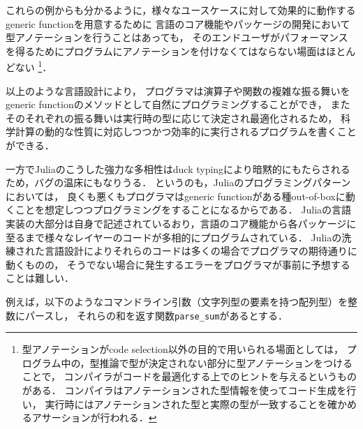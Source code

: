 これらの例からも分かるように，様々なユースケースに対して効果的に動作するgeneric functionを用意するために
言語のコア機能やパッケージの開発において型アノテーションを行うことはあっても，
そのエンドユーザがパフォーマンスを得るためにプログラムにアノテーションを付けなくてはならない場面はほとんどない
\footnote{
  型アノテーションがcode selection以外の目的で用いられる場面としては，
  プログラム中の，型推論で型が決定されない部分に型アノテーションをつけることで，
  コンパイラがコードを最適化する上でのヒントを与えるというものがある\cite{type-annotation}．
  コンパイラはアノテーションされた型情報を使ってコード生成を行い，
  実行時にはアノテーションされた型と実際の型が一致することを確かめるアサーションが行われる．
}．

以上のような言語設計により，
プログラマは演算子や関数の複雑な振る舞いをgeneric functionのメソッドとして自然にプログラミングすることができ\footnotemark，
またそのそれぞれの振る舞いは実行時の型に応じて決定され最適化されるため，
科学計算の動的な性質に対応しつつかつ効率的に実行されるプログラムを書くことができる．


一方でJuliaのこうした強力な多相性はduck typingにより暗黙的にもたらされるため，バグの温床にもなりうる．
というのも，Juliaのプログラミングパターンにおいては，
良くも悪くもプログラマはgeneric functionがある種out-of-boxに動くことを想定しつつプログラミングをすることになるからである．
Juliaの言語実装の大部分は自身で記述されているおり，言語のコア機能から各パッケージに至るまで様々なレイヤーのコードが多相的にプログラムされている．
Juliaの洗練された言語設計によりそれらのコードは多くの場合でプログラマの期待通りに動くものの，
そうでない場合に発生するエラーをプログラマが事前に予想することは難しい．

例えば，以下のようなコマンドライン引数（文字列型の要素を持つ配列型）を整数にパースし，
それらの和を返す関数\verb|parse_sum|があるとする．

